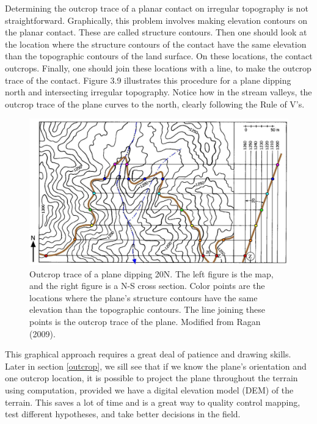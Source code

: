 \documentclass[a4paper , 12pt]{book}
\begin{document}
Determining the outcrop trace of a planar contact on irregular topography is not straightforward. Graphically, this problem involves making elevation contours on the planar contact. These are called structure contours. Then one should look at the location where the structure contours of the contact have the same elevation than the topographic contours of the land surface. On these locations, the contact outcrops. Finally, one should join these locations with a line, to make the outcrop trace of the contact. Figure 3.9 illustrates this procedure for a plane dipping north and intersecting irregular topography. Notice how in the stream valleys, the outcrop trace of the plane curves to the north, clearly following the Rule of V’s.

\begin{figure}[ht]
    \centering
    \includegraphics[width=13cm]{ch3f9.pdf}
    \caption{Outcrop trace of a plane dipping 20\degree\space N. The left figure is the map, and the right figure is a N-S cross section. Color points are the locations where the plane's structure contours have the same elevation than the topographic contours. The line joining these points is the outcrop trace of the plane. Modified from Ragan (2009).}
    \label{fig:outrace}
\end{figure}

This graphical approach requires a great deal of patience and drawing skills. Later in section \ref{outcrop}, we sill see that if we know the plane’s orientation and one outcrop location, it is possible to project the plane throughout the terrain using computation, provided we have a digital elevation model (DEM) of the terrain. This saves a lot of time and is a great way to quality control mapping, test different hypotheses, and take better decisions in the field.

\end{document}
